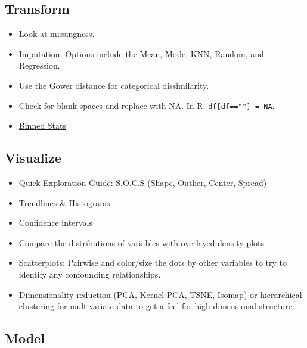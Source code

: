 \documentclass[]{book}
\begin{document}
\subsection{Transform}\label{transform}

\begin{itemize}
\item
  Look at missingness.
\item
  Imputation. Options include the Mean, Mode, KNN, Random, and
  Regression.
\item
  Use the Gower distance for categorical dissimilarity.
\item
  Check for blank spaces and replace with NA. In R:
  \texttt{df{[}df==""{]}\ =\ NA}.
\item
  \href{https://docs.scipy.org/doc/scipy-0.16.0/reference/generated/scipy.stats.binned_statistic.html}{Binned
  Stats}
\end{itemize}

\subsection{Visualize}\label{visualize}

\begin{itemize}
\item
  Quick Exploration Guide: S.O.C.S (Shape, Outlier, Center, Spread)
\item
  Trendlines \& Histograms
\item
  Confidence intervals
\item
  Compare the distributions of variables with overlayed density plots
\item
  Scatterplots: Pairwise and color/size the dots by other variables to
  try to identify any confounding relationships.
\item
  Dimensionality reduction (PCA, Kernel PCA, TSNE, Isomap) or
  hierarchical clustering for multivariate data to get a feel for high
  dimensional structure.
\end{itemize}

\subsection{Model}\label{model}
\end{document}
